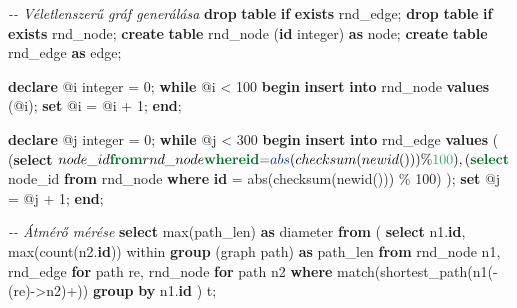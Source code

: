 \documentclass[
  magyar,
]{article}
\newenvironment{Shaded}{}{}
\newcommand{\CommentTok}[1]{\textcolor[rgb]{0.38,0.63,0.69}{\textit{#1}}}
\newcommand{\ControlFlowTok}[1]{\textcolor[rgb]{0.00,0.44,0.13}{\textbf{#1}}}
\newcommand{\DataTypeTok}[1]{\textcolor[rgb]{0.56,0.13,0.00}{#1}}
\newcommand{\DecValTok}[1]{\textcolor[rgb]{0.25,0.63,0.44}{#1}}
\newcommand{\FunctionTok}[1]{\textcolor[rgb]{0.02,0.16,0.49}{#1}}
\newcommand{\KeywordTok}[1]{\textcolor[rgb]{0.00,0.44,0.13}{\textbf{#1}}}
\newcommand{\NormalTok}[1]{#1}
\newcommand{\OperatorTok}[1]{\textcolor[rgb]{0.40,0.40,0.40}{#1}}
\begin{document}
\begin{Shaded}
\begin{Highlighting}[]
\CommentTok{{-}{-} Véletlenszerű gráf generálása}
\KeywordTok{drop} \KeywordTok{table} \ControlFlowTok{if} \KeywordTok{exists}\NormalTok{ rnd\_edge;}
\KeywordTok{drop} \KeywordTok{table} \ControlFlowTok{if} \KeywordTok{exists}\NormalTok{ rnd\_node;}
\KeywordTok{create} \KeywordTok{table}\NormalTok{ rnd\_node (}\KeywordTok{id} \DataTypeTok{integer}\NormalTok{) }\KeywordTok{as}\NormalTok{ node;}
\KeywordTok{create} \KeywordTok{table}\NormalTok{ rnd\_edge }\KeywordTok{as}\NormalTok{ edge;}

\KeywordTok{declare}\NormalTok{ @i }\DataTypeTok{integer} \OperatorTok{=} \DecValTok{0}\NormalTok{;}
\ControlFlowTok{while}\NormalTok{ @i }\OperatorTok{\textless{}} \DecValTok{100}
\ControlFlowTok{begin}
 \KeywordTok{insert} \KeywordTok{into}\NormalTok{ rnd\_node }\KeywordTok{values}\NormalTok{ (@i);}
 \KeywordTok{set}\NormalTok{ @i }\OperatorTok{=}\NormalTok{ @i }\OperatorTok{+} \DecValTok{1}\NormalTok{;}
\ControlFlowTok{end}\NormalTok{;}

\KeywordTok{declare}\NormalTok{ @j }\DataTypeTok{integer} \OperatorTok{=} \DecValTok{0}\NormalTok{;}
\ControlFlowTok{while}\NormalTok{ @j }\OperatorTok{\textless{}} \DecValTok{300}
\ControlFlowTok{begin}
 \KeywordTok{insert} \KeywordTok{into}\NormalTok{ rnd\_edge }\KeywordTok{values}\NormalTok{ (}
\NormalTok{  (}\KeywordTok{select}\NormalTok{ $node\_id }\KeywordTok{from}\NormalTok{ rnd\_node }\KeywordTok{where} \KeywordTok{id} \OperatorTok{=} \FunctionTok{abs}\NormalTok{(checksum(newid())) \% }\DecValTok{100}\NormalTok{),}
\NormalTok{  (}\KeywordTok{select}\NormalTok{ $node\_id }\KeywordTok{from}\NormalTok{ rnd\_node }\KeywordTok{where} \KeywordTok{id} \OperatorTok{=} \FunctionTok{abs}\NormalTok{(checksum(newid())) \% }\DecValTok{100}\NormalTok{)}
\NormalTok{ );}
 \KeywordTok{set}\NormalTok{ @j }\OperatorTok{=}\NormalTok{ @j }\OperatorTok{+} \DecValTok{1}\NormalTok{;}
\ControlFlowTok{end}\NormalTok{;}

\CommentTok{{-}{-} Átmérő mérése}
\KeywordTok{select} \FunctionTok{max}\NormalTok{(path\_len) }\KeywordTok{as}\NormalTok{ diameter}
\KeywordTok{from}\NormalTok{ (}
 \KeywordTok{select}\NormalTok{ n1.}\KeywordTok{id}\NormalTok{,}
    \FunctionTok{max}\NormalTok{(}\FunctionTok{count}\NormalTok{(n2.}\KeywordTok{id}\NormalTok{)) within }\KeywordTok{group}\NormalTok{ (graph path) }\KeywordTok{as}\NormalTok{ path\_len}
 \KeywordTok{from}\NormalTok{ rnd\_node n1,}
\NormalTok{   rnd\_edge }\ControlFlowTok{for}\NormalTok{ path re,}
\NormalTok{   rnd\_node }\ControlFlowTok{for}\NormalTok{ path n2}
 \KeywordTok{where}\NormalTok{ match(shortest\_path(n1(}\OperatorTok{{-}}\NormalTok{(re)}\OperatorTok{{-}\textgreater{}}\NormalTok{n2)}\OperatorTok{+}\NormalTok{))}
 \KeywordTok{group} \KeywordTok{by}\NormalTok{ n1.}\KeywordTok{id}
\NormalTok{) t;}
\end{Highlighting}
\end{Shaded}
\end{document}
